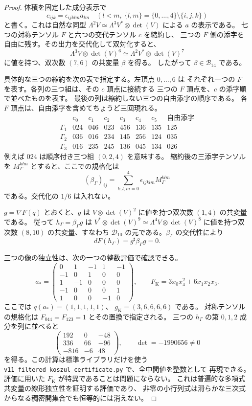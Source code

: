\documentclass[a4paper,11pt]{ltjsarticle}
\theoremstyle{definition}
\begin{document}
\begin{proof}
体積を固定した成分表示で
\[
 c_{ijk}=\epsilon_{ijklm}a_{lm}\quad(l<m,\ \{l,m\}=\{0,\ldots,4\}
                                  \setminus\{i,j,k\})
\]
と書く。これは自然な同型
$\Lambda^2V\simeq\Lambda^3V^*\otimes\det(V)$ による $a$ の表示である。
七つの対称テンソル $F$ と六つの交代テンソル $c$ を縮約し、
三つの $F$ 側の添字を自由に残す。その出力を交代化して双対化すると、
\[
 \Lambda^3V\otimes\det(V)^6
       \simeq\Lambda^2V^*\otimes\det(V)^7
\]
に値を持つ、双次数 $(7,6)$ の共変量 $\beta$ を得る。
したがって $\beta\in\mathcal B_{14}$ である。

具体的な三つの縮約を次の表で指定する。左頂点 $0,\ldots,6$ は
それぞれ一つの $F$ を表す。各列の三つ組は、その $c$ 頂点に接続する
三つの $F$ 頂点を、$c$ の添字順で並べたものを表す。
最後の列は縮約しない三つの自由添字の順序である。
各 $F$ 頂点は、自由添字を含めてちょうど三回現れる。
\[
\begin{array}{c|cccccc|c}
 &c_0&c_1&c_2&c_3&c_4&c_5&\text{自由添字}\\\hline
 \Gamma_1&024&046&023&456&136&135&125\\
 \Gamma_2&036&016&234&145&256&124&035\\
 \Gamma_3&016&235&245&136&045&134&026
\end{array}
\]
例えば $024$ は順序付き三つ組 $(0,2,4)$ を意味する。
縮約後の三添字テンソルを $M_\Gamma^{klm}$ とすると、ここでの規格化は
\[
 (\beta_\Gamma)_{ij}
     =\sum_{k,l,m=0}^4\epsilon_{ijklm}M_\Gamma^{klm}
\]
である。交代化の $1/6$ は入れない。

$g=\nabla F(q)$ とおくと、$g$ は
$V\otimes\det(V)^2$ に値を持つ双次数 $(1,4)$ の共変量である。
従って $h_\Gamma=\beta_\Gamma g$ は
$V^*\otimes\det(V)^9\simeq\Lambda^4V\otimes\det(V)^8$
に値を持つ双次数 $(8,10)$ の共変量、すなわち
$\mathcal D_{10}$ の元である。$\beta_\Gamma$ の交代性により
\[
 dF(h_\Gamma)=g^{\mathsf t}\beta_\Gamma g=0.
\]

三つの像の独立性は、次の一つの整数評価で確認できる。
\[
 a_*=
 \begin{pmatrix}
 0&1&-1&1&-1\\
 -1&0&1&0&0\\
 1&-1&0&0&0\\
 -1&0&0&0&1\\
 1&0&0&-1&0
 \end{pmatrix},
 \qquad
 F_{\mathrm K}=3x_0x_4^2+6x_1x_2x_3.
\]
ここでは $q(a_*)=(1,1,1,1,1)$、
$g_{\mathrm K}=(3,6,6,6,6)$ である。
対称テンソルの規格化は $F_{044}=F_{123}=1$ とその置換で指定される。
三つの $h_{\Gamma}$ の第 $0,1,2$ 成分を列に並べると
\[
 \begin{pmatrix}
 192&0&-48\\
 336&66&-96\\
 -816&-6&48
 \end{pmatrix},
 \qquad
 \det=-1990656\ne0
\]
を得る。この計算は標準ライブラリだけを使う
\texttt{v11\_filtered\_koszul\_certificate.py} で、全中間値を整数として
再現できる。
評価に用いた $F_{\mathrm K}$ が特異であることは問題にならない。
これは普遍的な多項式共変量の線形独立性を証明する評価であり、
非零の小行列式は滑らかな三次式からなる稠密開集合でも恒等的には消えない。


\end{proof}
\end{document}

